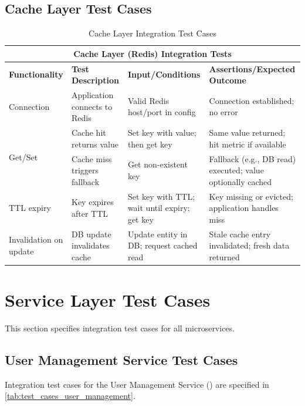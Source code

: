 \subsection{Cache Layer Test Cases}
\label{subsec:data_layer_cache_test_cases}%

\begin{table}[ht]
\centering
\begin{tabular}{|p{3.2cm}|p{3.8cm}|p{3.2cm}|p{4.8cm}|}
\hline
\multicolumn{4}{|c|}{\textbf{Cache Layer (Redis) Integration Tests}} \\ 
\hline
\textbf{Functionality} & \textbf{Test Description} & \textbf{Input/Conditions} & \textbf{Assertions/Expected Outcome} \\
\hline
Connection
 & Application connects to Redis
 & Valid Redis host/port in config
 & Connection established; no error \\
\hline
\multirow{2}{*}{Get/Set}
 & Cache hit returns value
 & Set key with value; then get key
 & Same value returned; hit metric if available \\ \cline{2-4}
 & Cache miss triggers fallback
 & Get non-existent key
 & Fallback (e.g., DB read) executed; value optionally cached \\
\hline
TTL expiry
 & Key expires after TTL
 & Set key with TTL; wait until expiry; get key
 & Key missing or evicted; application handles miss \\
\hline
Invalidation on update
 & DB update invalidates cache
 & Update entity in DB; request cached read
 & Stale cache entry invalidated; fresh data returned \\
\hline
\end{tabular}
\caption{Cache Layer Integration Test Cases}
\label{tab:test_cases_data_layer_cache}
\end{table}

\section{Service Layer Test Cases}
\label{sec:service_layer_test_cases}%

This section specifies integration test cases for all microservices.

\subsection{User Management Service Test Cases}
\label{subsec:user_management_service_test_cases}%

Integration test cases for the User Management Service () are specified in \cref{tab:test_cases_user_management}.

